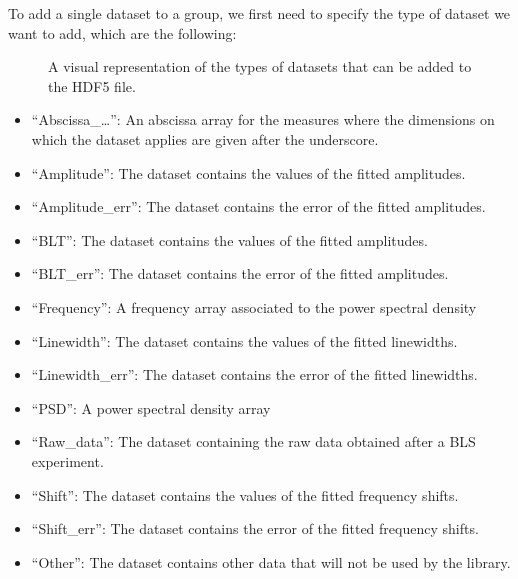 \documentclass[letterpaper,10pt,english]{sphinxmanual}
\begin{document}
\sphinxAtStartPar
To add a single dataset to a group, we first need to specify the type of dataset we want to add, which are the following:

\begin{figure}[htbp]
\centering
\capstart

\noindent{}
\caption{A visual representation of the types of datasets that can be added to the HDF5 file.}\label{\detokenize{source/hdf5_bls_package:id1}}\end{figure}
\begin{itemize}
\item {} 
\sphinxAtStartPar
“Abscissa\_…”: An abscissa array for the measures where the dimensions on which the dataset applies are given after the underscore.

\item {} 
\sphinxAtStartPar
“Amplitude”: The dataset contains the values of the fitted amplitudes.

\item {} 
\sphinxAtStartPar
“Amplitude\_err”: The dataset contains the error of the fitted amplitudes.

\item {} 
\sphinxAtStartPar
“BLT”: The dataset contains the values of the fitted amplitudes.

\item {} 
\sphinxAtStartPar
“BLT\_err”: The dataset contains the error of the fitted amplitudes.

\item {} 
\sphinxAtStartPar
“Frequency”: A frequency array associated to the power spectral density

\item {} 
\sphinxAtStartPar
“Linewidth”: The dataset contains the values of the fitted linewidths.

\item {} 
\sphinxAtStartPar
“Linewidth\_err”: The dataset contains the error of the fitted linewidths.

\item {} 
\sphinxAtStartPar
“PSD”: A power spectral density array

\item {} 
\sphinxAtStartPar
“Raw\_data”: The dataset containing the raw data obtained after a BLS experiment.

\item {} 
\sphinxAtStartPar
“Shift”: The dataset contains the values of the fitted frequency shifts.

\item {} 
\sphinxAtStartPar
“Shift\_err”: The dataset contains the error of the fitted frequency shifts.

\item {} 
\sphinxAtStartPar
“Other”: The dataset contains other data that will not be used by the library.

\end{itemize}
\end{document}
